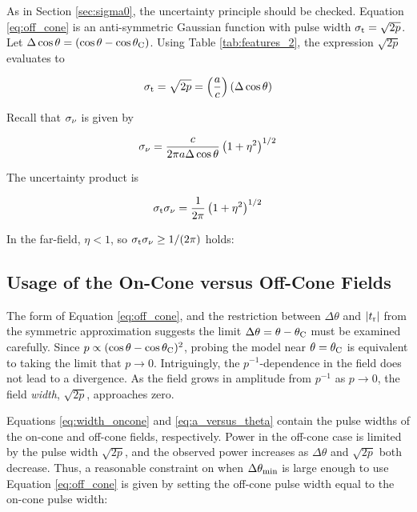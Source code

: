 \documentclass[amsmath,amssymb,aps,prd,10pt,twocolumn]{revtex4}
\begin{document}
As in Section \ref{sec:sigma0}, the uncertainty principle should be checked.  Equation \ref{eq:off_cone} is an anti-symmetric Gaussian function with pulse width $\sigma_{\rm t} = \sqrt{2p}$.  Let $\Delta\cos\theta = (\cos\theta - \cos\theta_{\rm C})$.  Using Table \ref{tab:features_2}, the expression $\sqrt{2p}$ evaluates to

\begin{equation}
\sigma_{\rm t} = \sqrt{2p} = \left(\frac{a}{c}\right)(\Delta \cos\theta) \label{eq:a_versus_theta}
\end{equation}

Recall that $\sigma_{\rm \nu}$ is given by

\begin{equation}
\sigma_{\rm \nu} = \frac{c}{2\pi a \Delta\cos\theta}\left(1+\eta^2\right)^{1/2} \label{eq:sigmanu3}
\end{equation}

The uncertainty product is

\begin{equation}
\sigma_{\rm t} \sigma_{\rm \nu} = \frac{1}{2 \pi} \left(1+\eta^2\right)^{1/2} \label{eq:sigma_result}
\end{equation}

In the far-field, $\eta < 1$, so $\sigma_{\rm t} \sigma_{\rm \nu} \geq 1/(2\pi)$ holds: 

\subsection{Usage of the On-Cone versus Off-Cone Fields}
\label{sec:usage}

The form of Equation \ref{eq:off_cone}, and the restriction between $\Delta\theta$ and $|t_{\rm r}|$ from the symmetric approximation suggests the limit $\Delta\theta = \theta-\theta_{\rm C}$ must be examined carefully.  Since $p \propto (\cos\theta - \cos\theta_{\rm C})^2$, probing the model near $\theta = \theta_{\rm C}$ is equivalent to taking the limit that $p \to 0$.  Intriguingly, the $p^{-1}$-dependence in the field does not lead to a divergence.  As the field grows in amplitude from $p^{-1}$ as $p \to 0$, the field \textit{width}, $\sqrt{2p}$, approaches zero.

Equations \ref{eq:width_oncone} and \ref{eq:a_versus_theta} contain the pulse widths of the on-cone and off-cone fields, respectively.  Power in the off-cone case is limited by the pulse width $\sqrt{2p}$, and the observed power increases as $\Delta\theta$ and $\sqrt{2p}$ both decrease.  Thus, a reasonable constraint on when $\Delta\theta_{\rm min}$ is large enough to use Equation \ref{eq:off_cone} is given by setting the off-cone pulse width equal to the on-cone pulse width:
\end{document}
